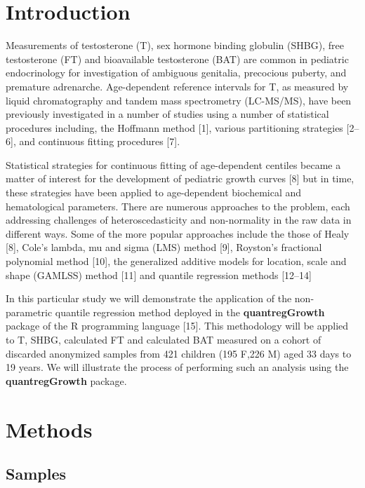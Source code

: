 \documentclass[]{elsarticle} %
\begin{document}
\hypertarget{introduction}{%
\section{Introduction}\label{introduction}}

Measurements of testosterone (T), sex hormone binding globulin (SHBG),
free testosterone (FT) and bioavailable testosterone (BAT) are common in
pediatric endocrinology for investigation of ambiguous genitalia,
precocious puberty, and premature adrenarche. Age-dependent reference
intervals for T, as measured by liquid chromatography and tandem mass
spectrometry (LC-MS/MS), have been previously investigated in a number
of studies using a number of statistical procedures including, the
Hoffmann method {[}1{]}, various partitioning strategies {[}2--6{]}, and
continuous fitting procedures {[}7{]}.

Statistical strategies for continuous fitting of age-dependent centiles
became a matter of interest for the development of pediatric growth
curves {[}8{]} but in time, these strategies have been applied to
age-dependent biochemical and hematological parameters. There are
numerous approaches to the problem, each addressing challenges of
heteroscedasticity and non-normality in the raw data in different ways.
Some of the more popular approaches include the those of Healy {[}8{]},
Cole's lambda, mu and sigma (LMS) method {[}9{]}, Royston's fractional
polynomial method {[}10{]}, the generalized additive models for
location, scale and shape (GAMLSS) method {[}11{]} and quantile
regression methods {[}12--14{]}

In this particular study we will demonstrate the application of the
non-parametric quantile regression method deployed in the
\textbf{quantregGrowth} package of the R programming language {[}15{]}.
This methodology will be applied to T, SHBG, calculated FT and
calculated BAT measured on a cohort of discarded anonymized samples from
421 children (195 F,226 M) aged 33 days to 19 years. We will illustrate
the process of performing such an analysis using the
\textbf{quantregGrowth} package.

\hypertarget{methods}{%
\section{Methods}\label{methods}}

\hypertarget{samples}{%
\subsection{Samples}\label{samples}}
\end{document}
